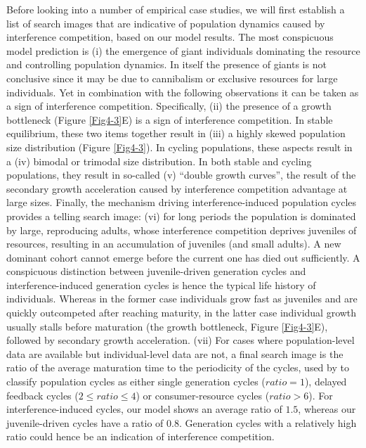 Before looking into a number of empirical case studies, we will first establish
a list of search images that are indicative of population dynamics caused by
interference competition, based on our model results. The most conspicuous model
prediction is (i) the emergence of giant individuals dominating the resource and
controlling population dynamics. In itself the presence of giants is not
conclusive since it may be due to cannibalism
\autocites{claessen2000a,persson2003a} or exclusive resources for large
individuals. Yet in combination with the following observations it can be taken
as a sign of interference competition. Specifically, (ii) the presence of a
growth bottleneck (Figure \ref{Fig4-3}E) is a sign of interference competition.
In stable equilibrium, these two items together result in (iii) a highly skewed
population size distribution (Figure \ref{Fig4-3}). In cycling populations,
these aspects result in a (iv) bimodal or trimodal size distribution. In both
stable and cycling populations, they result in so-called (v) “double growth
curves”, the result of the secondary growth acceleration caused by interference
competition advantage at large sizes.
Finally, the mechanism driving interference-induced population cycles provides a
telling search image: (vi) for long periods the population is dominated by
large, reproducing adults, whose interference competition deprives juveniles of
resources, resulting in an accumulation of juveniles (and small adults). A new
dominant cohort cannot emerge before the current one has died out sufficiently.
A conspicuous distinction between juvenile-driven generation cycles and
interference-induced generation cycles is hence the typical life history of
individuals. Whereas in the former case individuals grow fast as juveniles and
are quickly outcompeted after reaching maturity, in the latter case individual
growth usually stalls before maturation (the growth bottleneck, Figure
\ref{Fig4-3}E), followed by secondary growth acceleration. (vii) For cases where
population-level data are available but individual-level data are not, a final
search image is the ratio of the average maturation time to the periodicity of
the cycles, used by \textcite{murdoch2002a} to classify
population cycles as either single generation cycles ($ratio = 1$), delayed
feedback cycles ($2\leq ratio \leq 4$) or consumer-resource cycles ($ratio >
6$). For interference-induced cycles, our model shows an average ratio of $1.5$,
whereas our juvenile-driven cycles have a ratio of $0.8$. Generation cycles with
a relatively high ratio could hence be an indication of interference competition.

